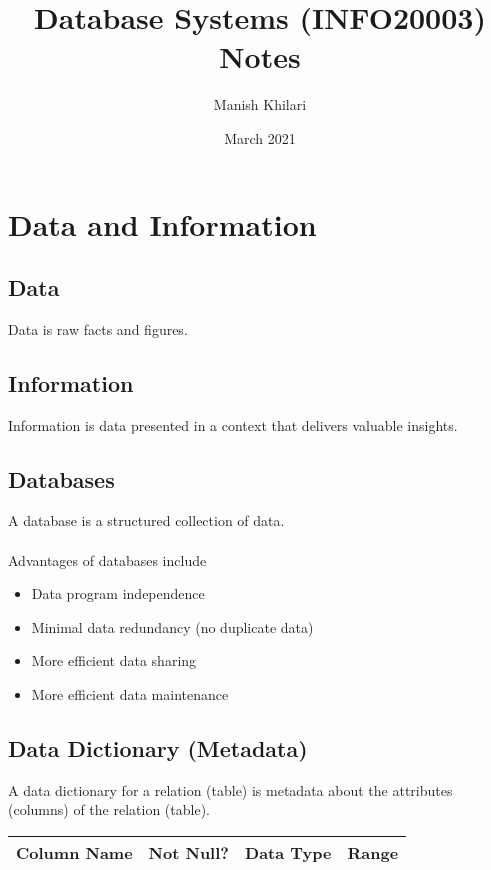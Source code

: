 \documentclass[11pt, a4paper]{article}
\title{Database Systems (INFO20003) Notes}
\author{Manish Khilari}
\date{March 2021}
\begin{document}
    
    \maketitle

    \section{Data and Information}
    \subsection{Data}
    Data is raw facts and figures. 

    \subsection{Information}
    Information is data presented in a context that delivers valuable insights. 

    \subsection{Databases}
    A database is a structured collection of data. \\\\
    Advantages of databases include 
    \begin{itemize}
        \item Data program independence 
        \item Minimal data redundancy (no duplicate data) 
        \item More efficient data sharing 
        \item More efficient data maintenance 
    \end{itemize}

    \subsection{Data Dictionary (Metadata)}
    A data dictionary for a relation (table) is metadata about the attributes 
    (columns) of the relation (table). 
    \begin{center}
        \begin{tabular}{ |c|c|c|c| } 
         \hline
         Column Name & Not Null? & Data Type & Range \\ 
         \hline
        \end{tabular}
    \end{center}
    
\end{document}

